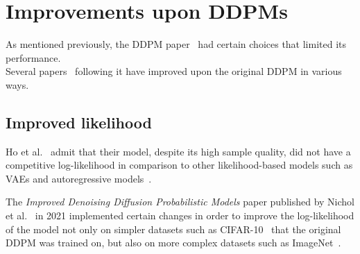 \documentclass{article}
\numberwithin{equation}{section}
\numberwithin{figure}{section}
\begin{document}
\newpage
\section{Improvements upon DDPMs}\label{improvements}

As mentioned previously, the DDPM paper~\cite{ho2020denoising} had certain choices that limited its performance.\\
Several papers~\cite{nichol2021improved, song2022denoising} following it have improved upon the original DDPM in various ways.

\subsection{Improved likelihood}
Ho et al.~\cite{ho2020denoising} admit that their model, despite its high sample quality, did not have a competitive log-likelihood in comparison to other likelihood-based models such as VAEs and autoregressive models~\cite{nichol2021improved}.

The \textit{Improved Denoising Diffusion Probabilistic Models} paper published by Nichol et al.~\cite{nichol2021improved} in 2021 implemented certain changes in order to improve the log-likelihood of the model not only on simpler datasets such as CIFAR-10~\cite{cifar10} that the original DDPM was trained on, but also on more complex datasets such as ImageNet~\cite{kingma2022autoencoding, nichol2021improved, oord2016conditional}.
\end{document}
